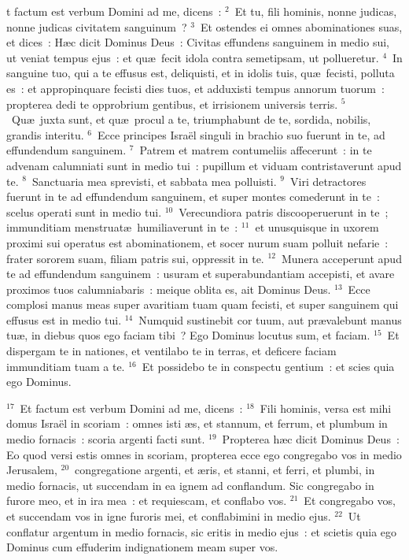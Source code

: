 \bchapter
{}t factum est verbum Domini ad me, dicens~:
${}^{2}$~Et tu, fili hominis, nonne judicas, nonne judicas civitatem sanguinum~?
${}^{3}$~Et ostendes ei omnes abominationes suas, et dices~: H\ae c dicit Dominus Deus~: Civitas effundens sanguinem in medio sui, ut veniat tempus ejus~: et qu\ae\ fecit idola contra semetipsam, ut pollueretur.
${}^{4}$~In sanguine tuo, qui a te effusus est, deliquisti, et in idolis tuis, qu\ae\ fecisti, polluta es~: et appropinquare fecisti dies tuos, et adduxisti tempus annorum tuorum~: propterea dedi te opprobrium gentibus, et irrisionem universis terris.
${}^{5}$~Qu\ae\ juxta sunt, et qu\ae\ procul a te, triumphabunt de te, sordida, nobilis, grandis interitu.
${}^{6}$~Ecce principes Isra\"el singuli in brachio suo fuerunt in te, ad effundendum sanguinem.
${}^{7}$~Patrem et matrem contumeliis affecerunt~: in te advenam calumniati sunt in medio tui~: pupillum et viduam contristaverunt apud te.
${}^{8}$~Sanctuaria mea sprevisti, et sabbata mea polluisti.
${}^{9}$~Viri detractores fuerunt in te ad effundendum sanguinem, et super montes comederunt in te~: scelus operati sunt in medio tui.
${}^{10}$~Verecundiora patris discooperuerunt in te~; immunditiam menstruat\ae\ humiliaverunt in te~:
${}^{11}$~et unusquisque in uxorem proximi sui operatus est abominationem, et socer nurum suam polluit nefarie~: frater sororem suam, filiam patris sui, oppressit in te.
${}^{12}$~Munera acceperunt apud te ad effundendum sanguinem~: usuram et superabundantiam accepisti, et avare proximos tuos calumniabaris~: meique oblita es, ait Dominus Deus.
${}^{13}$~Ecce complosi manus meas super avaritiam tuam quam fecisti, et super sanguinem qui effusus est in medio tui.
${}^{14}$~Numquid sustinebit cor tuum, aut pr\ae valebunt manus tu\ae , in diebus quos ego faciam tibi~? Ego Dominus locutus sum, et faciam.
${}^{15}$~Et dispergam te in nationes, et ventilabo te in terras, et deficere faciam immunditiam tuam a te.
${}^{16}$~Et possidebo te in conspectu gentium~: et scies quia ego Dominus.


${}^{17}$~Et factum est verbum Domini ad me, dicens~:
${}^{18}$~Fili hominis, versa est mihi domus Isra\"el in scoriam~: omnes isti \ae s, et stannum, et ferrum, et plumbum in medio fornacis~: scoria argenti facti sunt.
${}^{19}$~Propterea h\ae c dicit Dominus Deus~: Eo quod versi estis omnes in scoriam, propterea ecce ego congregabo vos in medio Jerusalem,
${}^{20}$~congregatione argenti, et \ae ris, et stanni, et ferri, et plumbi, in medio fornacis, ut succendam in ea ignem ad conflandum. Sic congregabo in furore meo, et in ira mea~: et requiescam, et conflabo vos.
${}^{21}$~Et congregabo vos, et succendam vos in igne furoris mei, et conflabimini in medio ejus.
${}^{22}$~Ut conflatur argentum in medio fornacis, sic eritis in medio ejus~: et scietis quia ego Dominus cum effuderim indignationem meam super vos.


